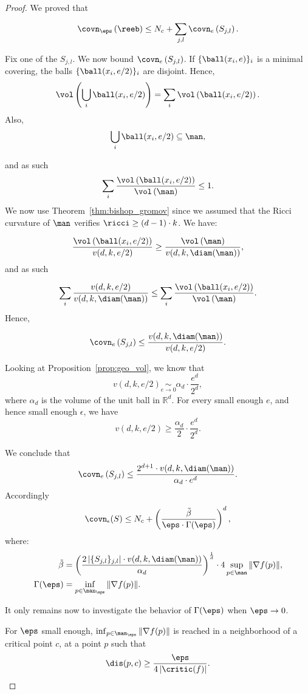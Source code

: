 \begin{proof}
We proved that

$$\covn_\eps\left(\reeb\right)\leq N_c+\sum_{j,l}\covn_e\left(S_{j,l}\right).$$
 
 Fix one of the $S_{j,l}$. We now bound $\covn_e\left(S_{j,l}\right)$. If $\{\ball(x_i,e)\}_i$ is a minimal covering, the balls $\{\ball(x_i,e/2)\}_i$ are disjoint. Hence, %
 $$\vol\left(\bigcup_{i}\ball(x_i,e/2)\right)=\sum_{i}\vol\left(\ball(x_i,e/2)\right).$$
Also, %
$$\bigcup_{i}\ball(x_i,e/2)\subseteq \man,$$

and as such
$$\sum_{i}\frac{\vol\left(\ball(x_i,e/2)\right)}{\vol\left(\man\right)}\leq 1.$$
We now use Theorem~\ref{thm:bishop_gromov} since we assumed that the Ricci curvature of $\man$ verifies $\ricci\geq(d-1)\cdot k$. We have:

$$\frac{\vol\left(\ball(x_i,e/2)\right)}{v(d,k,e/2)}\geq\frac{\vol\left(\man\right)}{v(d,k,\diam(\man))},$$
and as such

$$\sum_i \frac{v(d,k,e/2)}{v(d,k,\diam(\man))}\leq\sum_{i}\frac{\vol\left(\ball(x_i,e/2)\right)}{\vol\left(\man\right)}.$$
Hence,

$$\covn_e\left(S_{j,l}\right)\leq\frac{v(d,k,\diam(\man))}{v(d,k,e/2)}.$$

Looking at Proposition~\ref{prop:geo_vol}, we know that 
$$v(d,k,e/2)\underset{e\rightarrow0}{\sim}\alpha_d\cdot\frac{e^d}{2^d},$$
where $\alpha_d$ is the volume of the unit ball in $\mathbb{R}^d$.
For every small enough $e$, and hence small enough $\epsilon$, we have
$$v(d,k,e/2)\geq \frac{\alpha_d}{2}\cdot \frac{e^d}{2^d}.$$

We conclude that
$$\covn_e\left(S_{j,l}\right)\leq \frac{2^{d+1}\cdot v(d,k,\diam(\man))}{\alpha_d\cdot e^d}.$$
Accordingly
$$\covn_\epsilon(S)\leq N_c+\left(\frac{\Tilde{\beta}}{\eps\cdot\Gamma(\eps)}\right)^d,$$
where:
\begin{align*}
    \Tilde{\beta}&=\left(\frac{2\left|\{S_{j,l}\}_{j,l}\right|\cdot v(d,k,\diam(\man))}{\alpha_d}\right)^{\frac{1}{d}}\cdot4\sup_{p\in\man}\Vert\nabla f(p)\Vert,\\
    \Gamma(\eps)&=\inf_{p\in\man_\eps}\Vert\nabla f(p)\Vert.
\end{align*}


It only remains now to investigate the behavior of $\Gamma(\eps)$ when $\eps\rightarrow 0$.

For $\eps$ small enough, $\inf_{p\in\man_\eps}\Vert\nabla f(p)\Vert$ is reached in a neighborhood of a critical point $c$, at a point $p$ such that
$$\dis(p,c)\geq\frac{\eps}{4\left|\critic(f)\right|}.$$


\end{proof}
